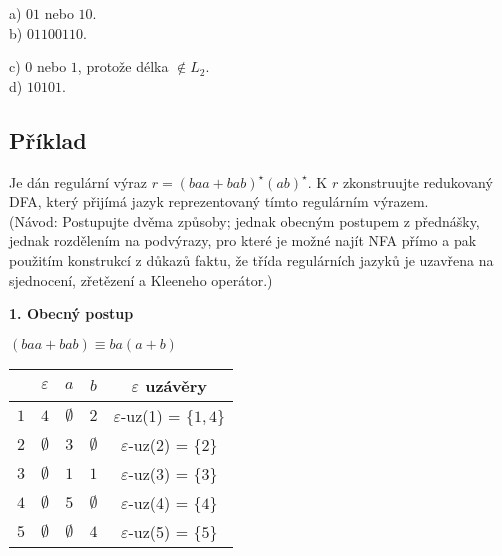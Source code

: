 \begin{multicols}{2}
    a) $01$ nebo $10$.\\
    b) $01100110$.
\columnbreak

    c) $0$ nebo $1$, protože délka $\not\in L_2$.\\
    d) $10101$.
\end{multicols}

\subsection{Příklad}
Je dán regulární výraz $r=(baa + bab)^\star (ab)^\star$. K $r$ zkonstruujte redukovaný DFA, který přijímá jazyk reprezentovaný tímto 
regulárním výrazem.\\
(Návod: Postupujte dvěma způsoby; jednak obecným postupem z přednášky, jednak rozdělením na podvýrazy, pro které je možné 
najít NFA přímo a pak použitím konstrukcí z důkazů faktu, že třída regulárních jazyků je uzavřena na sjednocení, zřetězení 
a Kleeneho operátor.)

\textbf{1. Obecný postup}

\begin{multicols}{2}

    $(baa + bab) \equiv ba(a+b)$


\columnbreak

    \begin{tabular}{|r|c c c|c|}
        \hline
        & $\varepsilon$ & $a$ & $b$ & $\varepsilon$ uzávěry\\
        \hline
        \hline
        $1$ & $4$ & $\emptyset$ & $2$         & $\varepsilon$-uz(1) = $\{1,4\}$\\
        $2$ & $\emptyset$ & $3$ & $\emptyset$ & $\varepsilon$-uz(2) = $\{2\}$\\
        $3$ & $\emptyset$ & $1$ & $1$         & $\varepsilon$-uz(3) = $\{3\}$\\
        $4$ & $\emptyset$ & $5$ & $\emptyset$ & $\varepsilon$-uz(4) = $\{4\}$\\
        $5$ & $\emptyset$ & $\emptyset$ & $4$ & $\varepsilon$-uz(5) = $\{5\}$\\
        \hline
    \end{tabular}
\end{multicols}


